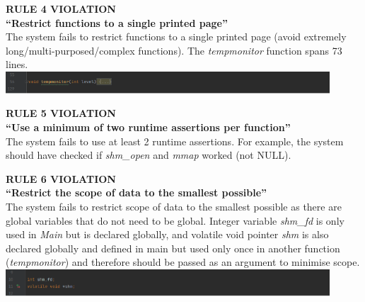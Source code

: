 \documentclass[a4paper]{article}
\begin{document}
\par \noindent \textbf{RULE 4 VIOLATION\\ “Restrict functions to a single printed page”} \\[1\baselineskip]
The system fails to restrict functions to a single printed page (avoid extremely long/multi-purposed/complex functions). The \emph{tempmonitor} function spans 73 lines. \\[1\baselineskip]
\includegraphics[width=12.12cm]{report-img/nasa-rule-4-violation.png}

\par \noindent \textbf{RULE 5 VIOLATION\\ “Use a minimum of two runtime assertions per function”} \\[1\baselineskip]
The system fails to use at least 2 runtime assertions. For example, the system should have checked if \emph{shm\_open} and \emph{mmap} worked (not NULL).

\par \noindent \textbf{RULE 6 VIOLATION\\ “Restrict the scope of data to the smallest possible”} \\[1\baselineskip]
The system fails to restrict scope of data to the smallest possible as there are global variables that do not need to be global. Integer variable \emph{shm\_fd} is only used in \emph{Main} but is declared globally, and volatile void pointer \emph{shm} is also declared globally and defined in main but used only once in another function (\emph{tempmonitor}) and therefore should be passed as an argument to minimise scope. \\[1\baselineskip]
\includegraphics[width=12.12cm]{report-img/nasa-rule-6-violation.png}
\end{document}
